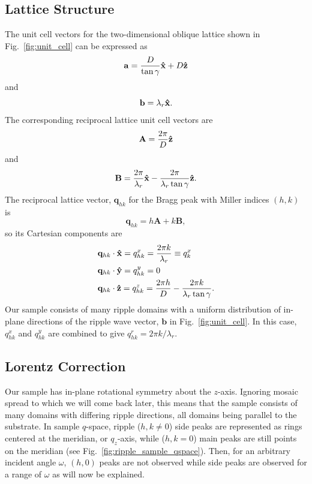 \subsection{Lattice Structure}\label{sec:lattice_structure}
The unit cell vectors for the two-dimensional oblique lattice shown in Fig.~\ref{fig:unit_cell}
can be expressed as 
\begin{equation}
  \mathbf{a} = \frac{D}{\tan\gamma}\mathbf{\hat{x}} + D\mathbf{\hat{z}}
\end{equation}
and
\begin{equation}
  \mathbf{b} = \lambda_r\mathbf{\hat{x}}.
\end{equation}
The corresponding reciprocal lattice unit cell vectors are
\begin{equation}
  \mathbf{A} = \frac{2\pi}{D}\mathbf{\hat{z}}
\end{equation}
and
\begin{equation}
  \mathbf{B} = \frac{2\pi}{\lambda_r}\mathbf{\hat{x}} - \frac{2\pi}{\lambda_r\tan\gamma}\mathbf{\hat{z}}.
\end{equation}
The reciprocal lattice vector, $\mathbf{q}_{hk}$ for the Bragg peak with 
Miller indices $(h,k)$ is 
\begin{equation}
  \mathbf{q}_{hk}=h\mathbf{A}+k\mathbf{B},
\end{equation}
so its Cartesian components are
\begin{align}
  & \mathbf{q}_{hk}\cdot\mathbf{\hat{x}} = q_{hk}^x = \frac{2\pi k}{\lambda_r} \equiv q_{k}^x \\
  & \mathbf{q}_{hk}\cdot\mathbf{\hat{y}} = q_{hk}^y = 0 \\
  & \mathbf{q}_{hk}\cdot\mathbf{\hat{z}} = q_{hk}^z = \frac{2\pi h}{D} - \frac{2\pi k}{\lambda_r\tan\gamma}.
\end{align}
Our sample consists of many ripple domains with a uniform distribution of in-plane directions of the
ripple wave vector, $\mathbf{b}$ in Fig.~\ref{fig:unit_cell}. 
In this case, $q_{hk}^x$ and $q_{hk}^y$ are combined to 
give $q_{hk}^r = 2\pi k/\lambda_r$.

\subsection{Lorentz Correction}\label{sec:Lorentz_correction}
Our sample has in-plane rotational symmetry about the $z$-axis. 
Ignoring mosaic spread to which we will come back later, this means that the sample 
consists of many domains with differing ripple directions, all domains
being parallel to the substrate.  
In sample $q$-space, ripple ($h,k\neq 0$) side peaks are represented as rings 
centered at the meridian, or $q_z$-axis, 
while ($h,k=0$) main peaks are still points on the meridian 
(see Fig.~\ref{fig:ripple_sample_qspace}). 
Then, for an arbitrary incident angle $\omega$, $(h,0)$ peaks are not observed
while side peaks are observed for a range of $\omega$ as will now be explained. 

